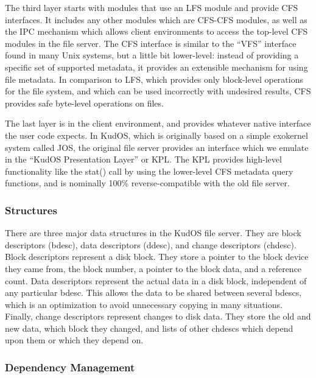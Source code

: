 The third layer starts with modules that use an LFS module and provide CFS
interfaces. It includes any other modules which are CFS-CFS modules, as well as
the IPC mechanism which allows client environments to access the top-level CFS
modules in the file server. The CFS interface is similar to the ``VFS''
interface found in many Unix systems, but a little bit lower-level: instead of
providing a specific set of supported metadata, it provides an extensible
mechanism for using file metadata. In comparison to LFS, which provides only
block-level operations for the file system, and which can be used incorrectly
with undesired results, CFS provides safe byte-level operations on files.

The last layer is in the client environment, and provides whatever native
interface the user code expects. In KudOS, which is originally based on a simple
exokernel system called JOS, the original file server provides an interface
which we emulate in the ``KudOS Presentation Layer'' or KPL. The KPL provides
high-level functionality like the stat() call by using the lower-level CFS
metadata query functions, and is nominally 100\% reverse-compatible with the old
file server.

\subsubsection{Structures}
\label{sec:solution:arch:structs}

There are three major data structures in the KudOS file server. They are block
descriptors (bdesc), data descriptors (ddesc), and change descriptors (chdesc).
Block descriptors represent a disk block. They store a pointer to the block
device they came from, the block number, a pointer to the block data, and a
reference count. Data descriptors represent the actual data in a disk block,
independent of any particular bdesc. This allows the data to be shared between
several bdescs, which is an optimization to avoid unnecessary copying in many
situations. Finally, change descriptors represent changes to disk data. They
store the old and new data, which block they changed, and lists of other chdescs
which depend upon them or which they depend on.

\subsubsection{Dependency Management}
\label{sec:solution:arch:depman}

